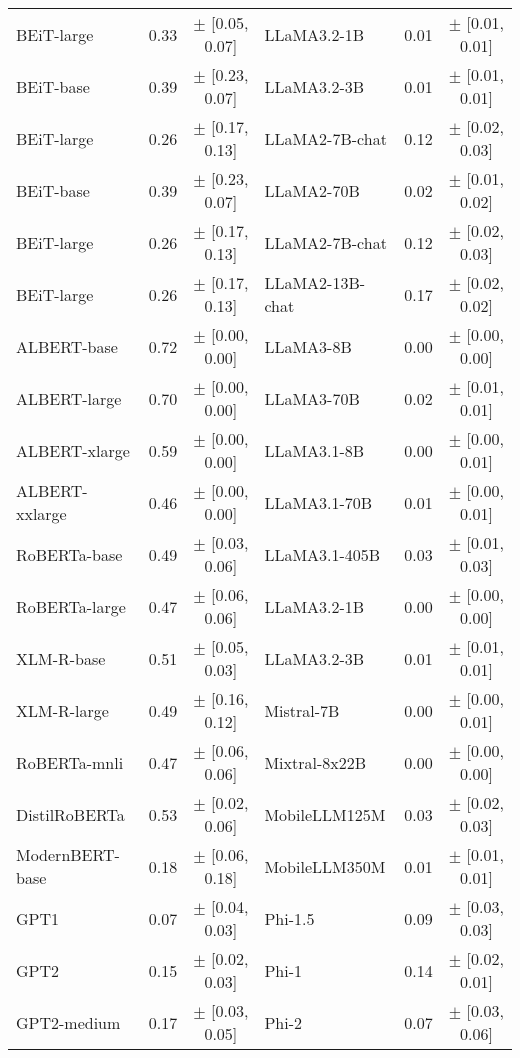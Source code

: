 \begin{table}
\begin{tabular}{lcc|lcc}
    BEiT-large    & 0.33 & $\pm$ [0.05, 0.07] & LLaMA3.2-1B    & 0.01 & $\pm$ [0.01, 0.01] \\ 
    BEiT-base     & 0.39 & $\pm$ [0.23, 0.07] & LLaMA3.2-3B    & 0.01 & $\pm$ [0.01, 0.01] \\ 
    BEiT-large    & 0.26 & $\pm$ [0.17, 0.13] & LLaMA2-7B-chat & 0.12 & $\pm$ [0.02, 0.03] \\ 
    BEiT-base     & 0.39 & $\pm$ [0.23, 0.07] & LLaMA2-70B     & 0.02 & $\pm$ [0.01, 0.02] \\ 
    BEiT-large    & 0.26 & $\pm$ [0.17, 0.13] & LLaMA2-7B-chat & 0.12 & $\pm$ [0.02, 0.03] \\ 
    BEiT-large    & 0.26 & $\pm$ [0.17, 0.13] & LLaMA2-13B-chat & 0.17 & $\pm$ [0.02, 0.02] \\ 
    ALBERT-base   & 0.72 & $\pm$ [0.00, 0.00] & LLaMA3-8B      & 0.00 & $\pm$ [0.00, 0.00] \\ 
    ALBERT-large  & 0.70 & $\pm$ [0.00, 0.00] & LLaMA3-70B     & 0.02 & $\pm$ [0.01, 0.01] \\ 
    ALBERT-xlarge & 0.59 & $\pm$ [0.00, 0.00] & LLaMA3.1-8B    & 0.00 & $\pm$ [0.00, 0.01] \\ 
    ALBERT-xxlarge & 0.46 & $\pm$ [0.00, 0.00] & LLaMA3.1-70B   & 0.01 & $\pm$ [0.00, 0.01] \\ 
    RoBERTa-base  & 0.49 & $\pm$ [0.03, 0.06] & LLaMA3.1-405B  & 0.03 & $\pm$ [0.01, 0.03] \\ 
    RoBERTa-large & 0.47 & $\pm$ [0.06, 0.06] & LLaMA3.2-1B    & 0.00 & $\pm$ [0.00, 0.00] \\ 
    XLM-R-base    & 0.51 & $\pm$ [0.05, 0.03] & LLaMA3.2-3B    & 0.01 & $\pm$ [0.01, 0.01] \\ 
    XLM-R-large   & 0.49 & $\pm$ [0.16, 0.12] & Mistral-7B     & 0.00 & $\pm$ [0.00, 0.01] \\ 
    RoBERTa-mnli  & 0.47 & $\pm$ [0.06, 0.06] & Mixtral-8x22B  & 0.00 & $\pm$ [0.00, 0.00] \\ 
    DistilRoBERTa & 0.53 & $\pm$ [0.02, 0.06] & MobileLLM125M  & 0.03 & $\pm$ [0.02, 0.03] \\ 
    ModernBERT-base & 0.18 & $\pm$ [0.06, 0.18] & MobileLLM350M & 0.01 & $\pm$ [0.01, 0.01] \\ 
    GPT1          & 0.07 & $\pm$ [0.04, 0.03] & Phi-1.5        & 0.09 & $\pm$ [0.03, 0.03] \\ 
    GPT2          & 0.15 & $\pm$ [0.02, 0.03] & Phi-1          & 0.14 & $\pm$ [0.02, 0.01] \\ 
    GPT2-medium   & 0.17 & $\pm$ [0.03, 0.05] & Phi-2          & 0.07 & $\pm$ [0.03, 0.06] \\ 
    \bottomrule
\end{tabular}
\end{table}

